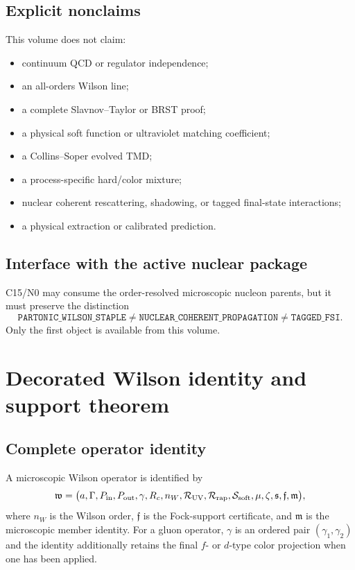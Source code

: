 \documentclass[11pt]{article}
\newcommand{\cR}{\mathcal R}
\newcommand{\cS}{\mathcal S}
\newcommand{\UV}{\mathrm{UV}}
\begin{document}
\subsection{Explicit nonclaims}

This volume does not claim:
\begin{itemize}
 \item continuum QCD or regulator independence;
 \item an all-orders Wilson line;
 \item a complete Slavnov--Taylor or BRST proof;
 \item a physical soft function or ultraviolet matching coefficient;
 \item a Collins--Soper evolved TMD;
 \item a process-specific hard/color mixture;
 \item nuclear coherent rescattering, shadowing, or tagged final-state
 interactions;
 \item a physical extraction or calibrated prediction.
\end{itemize}

\subsection{Interface with the active nuclear package}

C15/N0 may consume the order-resolved microscopic nucleon parents, but it must
preserve the distinction
\begin{equation}
 \texttt{PARTONIC\_WILSON\_STAPLE}
 \neq
 \texttt{NUCLEAR\_COHERENT\_PROPAGATION}
 \neq
 \texttt{TAGGED\_FSI}.
 \label{eq:parton-nuclear-distinction}
\end{equation}
Only the first object is available from this volume.

\section{Decorated Wilson identity and support theorem}
\label{sec:identity}

\subsection{Complete operator identity}

A microscopic Wilson operator is identified by
\begin{equation}
 \mathfrak w=
 \bigl(
 a,\Gamma,P_{\rm in},P_{\rm out},
 \gamma,R_c,n_W,
 \cR_{\UV},\cR_{\rm rap},\cS_{\rm soft},
 \mu,\zeta,\mathfrak s,
 \mathfrak f,\mathfrak m
 \bigr),
 \label{eq:wilson-id}
\end{equation}
where \(n_W\) is the Wilson order, \(\mathfrak f\) is the Fock-support
certificate, and \(\mathfrak m\) is the microscopic member identity.  For a
gluon operator, \(\gamma\) is an ordered pair \((\gamma_1,\gamma_2)\) and
the identity additionally retains the final \(f\)- or \(d\)-type color
projection when one has been applied.
\end{document}
